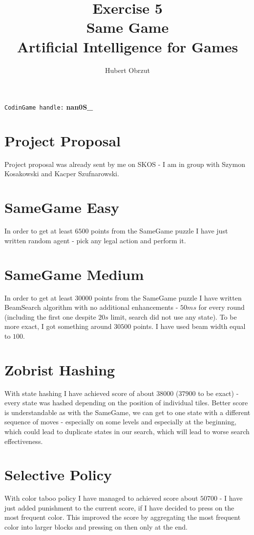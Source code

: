 \documentclass[11pt]{article}
\title{
	Exercise 5 \\
	Same Game \\
	Artificial Intelligence for Games \\
}
\author{Hubert Obrzut}
\begin{document}
	\maketitle
	
	\texttt{CodinGame handle:} \textbf{nan0S\_}
	
	\section{Project Proposal}
	Project proposal was already sent by me on SKOS - I am in group with Szymon Kosakowski and Kacper Szufnarowski.
	
	\section{SameGame Easy}
	In order to get at least $6500$ points from the SameGame puzzle I have just written random agent - pick any legal action and perform it.
	
	\section{SameGame Medium}
	In order to get at least $30000$ points from the SameGame puzzle I have written BeamSearch algorithm with no additional enhancements - $50ms$ for every round (including the first one despite $20s$ limit, search did not use any state). To be more exact, I got something around $30500$ points. I have used beam width equal to $100$.
	
	\section{Zobrist Hashing}
	With state hashing I have achieved score of about $38000$ ($37900$ to be exact) - every state was hashed depending on the position of individual tiles. Better score is understandable as with the SameGame, we can get to one state with a different sequence of moves - especially on some levels and especially at the beginning, which could lead to duplicate states in our search, which will lead to worse search effectiveness.
	
	\section{Selective Policy}
	With color taboo policy I have managed to achieved score about $50700$ - I have just added punishment to the current score, if I have decided to press on the most frequent color. This improved the score by aggregating the most frequent color into larger blocks and pressing on then only at the end.
	
\end{document}

